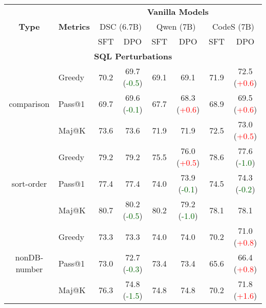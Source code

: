 \begin{table*}[t!]
    \centering
\begin{adjustbox}{max width=\textwidth}
    \begin{tabular}{c | l | c c | c c | c c }
        \toprule
         \multirow{3}{*}{\textbf{Type}} & \multirow{3}{*}{\textbf{Metrics}} & \multicolumn{6}{c}{\textbf{Vanilla Models}} \\ \cline{3-8}
         & & \multicolumn{2}{c}{DSC (6.7B)} & \multicolumn{2}{c}{Qwen (7B)} & \multicolumn{2}{c}{CodeS (7B)} \\ \cline{3-8}
         & & SFT & DPO & SFT & DPO & SFT & DPO \\ \midrule
        \multicolumn{8}{c}{\textbf{SQL Perturbations}} \\ \midrule

        \multirow{3}{*}{comparison} & Greedy & 70.2 & 69.7 (\textcolor{darkgreen}{-0.5}) & 69.1 & 69.1 \phantom{(+0.3)} & 71.9 & 72.5 (\textcolor{red}{+0.6}) \\
& Pass@1 & 69.7 & 69.6 (\textcolor{darkgreen}{-0.1}) & 67.7 & 68.3 (\textcolor{red}{+0.6}) & 68.9 & 69.5 (\textcolor{red}{+0.6}) \\
& Maj@K & 73.6 & 73.6 \phantom{(+0.3)} & 71.9 & 71.9 \phantom{(+0.3)} & 72.5 & 73.0 (\textcolor{red}{+0.5}) \\
 \midrule

        \multirow{3}{*}{sort-order} & Greedy & 79.2 & 79.2 \phantom{(+0.3)} & 75.5 & 76.0 (\textcolor{red}{+0.5}) & 78.6 & 77.6 (\textcolor{darkgreen}{-1.0}) \\
& Pass@1 & 77.4 & 77.4 \phantom{(+0.3)} & 74.0 & 73.9 (\textcolor{darkgreen}{-0.1}) & 74.5 & 74.3 (\textcolor{darkgreen}{-0.2}) \\
& Maj@K & 80.7 & 80.2 (\textcolor{darkgreen}{-0.5}) & 80.2 & 79.2 (\textcolor{darkgreen}{-1.0}) & 78.1 & 78.1 \phantom{(+0.3)} \\
 \midrule

        \multirow{3}{*}{nonDB-number} & Greedy & 73.3 & 73.3 \phantom{(+0.3)} & 74.0 & 74.0 \phantom{(+0.3)} & 70.2 & 71.0 (\textcolor{red}{+0.8}) \\
& Pass@1 & 73.0 & 72.7 (\textcolor{darkgreen}{-0.3}) & 73.4 & 73.4 \phantom{(+0.3)} & 65.6 & 66.4 (\textcolor{red}{+0.8}) \\
& Maj@K & 76.3 & 74.8 (\textcolor{darkgreen}{-1.5}) & 74.8 & 74.8 \phantom{(+0.3)} & 70.2 & 71.8 (\textcolor{red}{+1.6}) \\
 \midrule
        

\end{tabular}
\end{adjustbox}
\end{table*}
